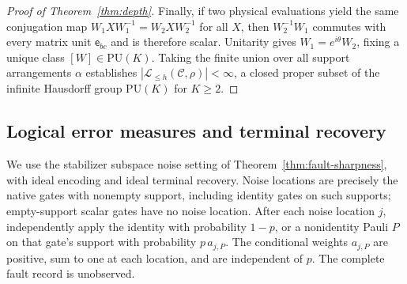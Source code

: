 \documentclass[aps,prl,reprint,longbibliography,nofootinbib,nobibnotes]{revtex4-2}
\newcommand{\PU}{\mathrm{PU}}
\begin{document}
\begin{proof}[Proof of Theorem~\ref{thm:depth}]
Finally, if two physical evaluations yield the same conjugation map $W_1XW_1^{-1}=W_2XW_2^{-1}$ for
all $X$, then $W_2^{-1}W_1$ commutes with every matrix unit $\mathsf e_{bc}$ and is therefore
scalar. Unitarity gives $W_1=e^{i\theta}W_2$, fixing a unique class $[W]\in\PU(K)$. Taking the
finite union over all support arrangements $\alpha$ establishes $|\mathcal L_{\le h}(\mathcal
C,\rho)|<\infty$, a closed proper subset of the infinite Hausdorff group $\PU(K)$ for $K\ge2$.
\end{proof}

\subsection*{Logical error measures and terminal recovery}
\label{sm:logical-error-measures}

We use the stabilizer subspace noise setting of Theorem~\ref{thm:fault-sharpness}, with ideal
encoding and ideal terminal recovery. Noise locations are precisely the native gates with nonempty support, including identity gates on such supports; empty-support scalar gates have no noise location. After each noise location $j$, independently apply
the identity with probability $1-p$, or a nonidentity Pauli $P$ on that gate's support with
probability $p\,a_{j,P}$. The conditional weights $a_{j,P}$ are positive, sum to one at each
location, and are independent of $p$. The complete fault record is unobserved.
\end{document}
